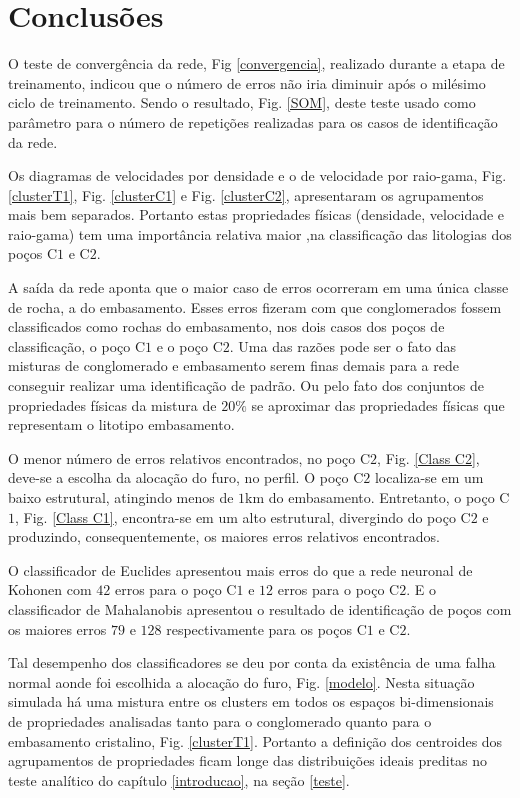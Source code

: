 \chapter{Conclusões}

O teste de convergência da rede, Fig \ref{convergencia}, realizado durante a etapa de treinamento, indicou que o número de erros não iria diminuir após o milésimo ciclo de treinamento. Sendo o resultado, Fig. \ref{SOM}, deste teste usado como parâmetro para o número de repetições realizadas para os casos de identificação da rede. 

Os diagramas de velocidades por densidade e o de velocidade por raio-gama, Fig. \ref{clusterT1}, Fig. \ref{clusterC1} e Fig. \ref{clusterC2}, apresentaram os agrupamentos mais bem separados. Portanto estas propriedades físicas (densidade, velocidade e raio-gama) tem uma importância relativa maior ,na classificação das litologias dos poços C$1$ e C$2$. 

A saída da rede aponta que o maior caso de erros ocorreram em uma única classe de rocha, a do embasamento. Esses erros fizeram com que conglomerados fossem classificados como rochas do embasamento, nos dois casos dos poços de classificação, o poço C$1$ e o poço C$2$.  Uma das razões pode ser o fato das misturas de conglomerado e embasamento serem finas demais para a rede conseguir realizar uma identificação de padrão. Ou pelo fato dos conjuntos de propriedades físicas da mistura de $20\%$ se aproximar das propriedades físicas que representam o litotipo embasamento. 

O menor número de erros relativos encontrados, no poço C$2$, Fig. \ref{Class C2}, deve-se a escolha da alocação do furo, no perfil. O poço C$2$ localiza-se em um baixo estrutural, atingindo menos de $1$km do embasamento. Entretanto, o poço C$1$, Fig. \ref{Class C1}, encontra-se em um alto estrutural, divergindo do poço C$2$ e produzindo, consequentemente, os maiores erros relativos encontrados.    

O classificador de Euclides apresentou mais erros do que a rede neuronal de Kohonen com $42$ erros para o poço C$1$ e $12$ erros para o poço C$2$. E o classificador de Mahalanobis apresentou o resultado de identificação de poços com os maiores erros $79$ e $128$ respectivamente para os poços C$1$ e C$2$. 

Tal desempenho dos classificadores se deu por conta da existência de uma falha normal aonde foi escolhida a alocação do furo, Fig. \ref{modelo}. Nesta situação simulada há uma mistura entre os clusters em todos os espaços bi-dimensionais de propriedades analisadas tanto para o conglomerado quanto para o embasamento cristalino, Fig. \ref{clusterT1}. Portanto a definição dos centroides dos agrupamentos de propriedades ficam longe das distribuições ideais preditas no teste analítico do capítulo \ref{introducao}, na seção \ref{teste}.  

